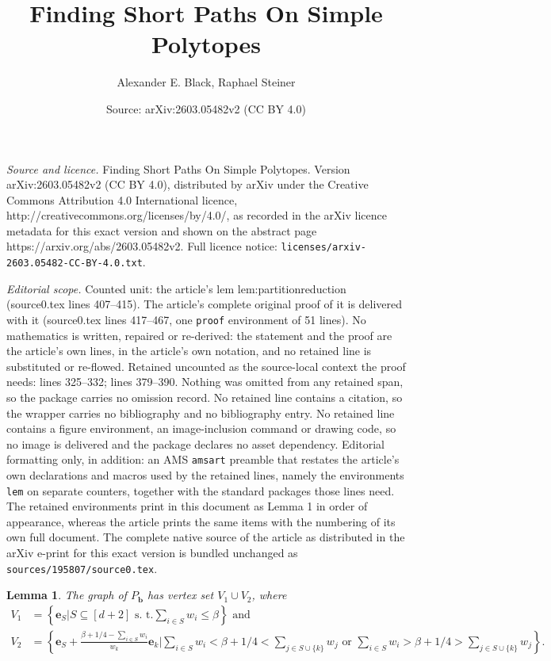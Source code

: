 \documentclass[10pt,a4paper]{amsart}
\title{Finding Short Paths On Simple Polytopes}
\author{Alexander E. Black, Raphael Steiner}
\date{Source: arXiv:2603.05482v2 (CC BY 4.0)}
\newtheorem{lem}{Lemma}
\begin{document}
\maketitle

\noindent\emph{Source and licence.} Finding Short Paths On Simple Polytopes. Version arXiv:2603.05482v2 (CC BY 4.0), distributed by arXiv under the Creative Commons Attribution 4.0 International licence, http://creativecommons.org/licenses/by/4.0/, as recorded in the arXiv licence metadata for this exact version and shown on the abstract page https://arxiv.org/abs/2603.05482v2. Full licence notice: \texttt{licenses/arxiv-2603.05482-CC-BY-4.0.txt}.\par\smallskip

\noindent\textit{Editorial scope.} Counted unit: the article's lem lem:partitionreduction (source0.tex lines 407--415). The article's complete original proof of it is delivered with it (source0.tex lines 417--467, one \texttt{proof} environment of 51 lines). No mathematics is written, repaired or re-derived: the statement and the proof are the article's own lines, in the article's own notation, and no retained line is substituted or re-flowed.  Retained uncounted as the source-local context the proof needs: lines 325--332; lines 379--390.  Nothing was omitted from any retained span, so the package carries no omission record.  No retained line contains a citation, so the wrapper carries no bibliography and no bibliography entry.  No retained line contains a figure environment, an image-inclusion command or drawing code, so no image is delivered and the package declares no asset dependency.  Editorial formatting only, in addition: an AMS \texttt{amsart} preamble that restates the article's own declarations and macros used by the retained lines, namely the environments \texttt{lem} on separate counters, together with the standard packages those lines need.  The retained environments print in this document as Lemma 1 in order of appearance, whereas the article prints the same items with the numbering of its own full document.  The complete native source of the article as distributed in the arXiv e-print for this exact version is bundled unchanged as \texttt{sources/195807/source0.tex}.
\begin{lem}
\label{lem:knapsackvertices}
The graph of $P_{\mathbf{b}}$ has vertex set $V_{1} \cup V_{2}$, where 
\begin{align*}
    V_{1} &= \left\{\mathbf{e}_S\bigg\vert S\subseteq [d+2] \text{ s. t.} \sum_{i \in S} w_{i} \leq \beta\right\} \text{ and} \\
    V_{2} &= \left\{\mathbf{e}_{S} + \frac{\beta+1/4-\sum_{i\in S} w_{i}}{w_{k}} \mathbf{e}_{k}\bigg\vert \sum_{i \in S} w_{i} < \beta + 1/4< \sum_{j \in S \cup \{k\}} w_{j} \text{ or }\sum_{i \in S} w_{i} > \beta + 1/4 > \sum_{j \in S \cup \{k\}} w_{j}\right\}.
\end{align*}
\end{lem}
\end{document}
